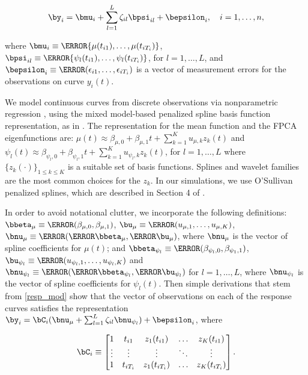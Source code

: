 \documentclass[ba]{imsart}
\numberwithin{equation}{section}
\theoremstyle{plain}
\def\betamu{\bbeta_\mu}
\def\umu{\bu_\mu}
\def\numu{\bnu_\mu}
\newcommand\betapsi[1]{\bbeta_{\psi_{#1}}}
\newcommand\upsi[1]{\bu_{\psi_{#1}}}
\newcommand\nupsi[1]{\bnu_{\psi_{#1}}}
\begin{document}
\begin{equation}
	\by_i = \bmu_i + \sum_{l=1}^L \zeta_{il} \bpsi_{il} + \bepsilon_{i}, \quad i = 1, \dots, n,
\label{resp_mod}
\end{equation}

\noindent where $\bmu_i \equiv \T{\{ \mu (t_{i1}), \dots, \mu (t_{iT_i}) \}}$,
$\bpsi_{il} \equiv \T{\{ \psi_l (t_{i1}), \dots, \psi_l (t_{iT_i}) \}}$, for $l = 1, \dots, L$, and
$\bepsilon_{i} \equiv \T{(\epsilon_{i1}, \dots, \epsilon_{iT_i})}$ is a vector of measurement errors
for the observations on curve $y_i (t)$.

We model continuous curves from discrete observations via nonparametric regression \citep{ruppert03, ruppert09},
using the mixed model-based penalized spline basis function representation, as in \citet{durban05}. The
representation for the mean function and the FPCA eigenfunctions are:
$\mu (t) \approx \beta_{\mu, 0} + \beta_{\mu, 1} t + \sum_{k=1}^K u_{\mu, k} z_k (t)$ and
$\psi_l (t) \approx \beta_{\psi_l, 0} + \beta_{\psi_l, 1} t + \sum_{k=1}^K u_{\psi_l, k} z_k (t)$,
for $l = 1, \dots, L$ where $\{ z_k (\cdot) \}_{1 \le k \le K}$ is a suitable set of
basis functions. Splines and wavelet families are the most common choices for the $z_k$. In our simulations, we
use O'Sullivan penalized splines, which are described in Section 4 of \citet{wand08}.

In order to avoid notational clutter, we incorporate the following definitions:
$\betamu \equiv \T{(\beta_{\mu, 0}, \beta_{\mu, 1})}$, $\umu \equiv \T{(u_{\mu, 1}, \dots, u_{\mu, K})}$,
$\numu \equiv \T{(\T{\betamu}, \T{\umu})}$, where $\numu$ is the vector of spline coefficients for $\mu (t)$;
and $\betapsi{l} \equiv \T{(\beta_{\psi_l, 0}, \beta_{\psi_1, 1})}$,
$\upsi{l} \equiv \T{(u_{\psi_l, 1}, \dots, u_{\psi_l, K})}$ and $\nupsi{l} \equiv \T{(\T{\betapsi{l}}, \T{\upsi{l}})}$
for $l = 1, \dots, L$, where $\nupsi{l}$ is the vector of spline coefficients for $\psi_l (t)$.
Then simple derivations that stem from \eqref{resp_mod} show that the vector of observations on
each of the response curves satisfies the representation $\by_i = \bC_i (\numu + \sum_{l=1}^L \zeta_{il} \nupsi{l}) +
\bepsilon_{i}$, where

\begin{equation}
	\bC_i \equiv \begin{bmatrix}
		1 & t_{i1} & z_1 (t_{i1}) & \dots & z_K (t_{i1}) \\
		\vdots & \vdots & \vdots & \ddots & \vdots \\
		1 & t_{iT_i} & z_1 (t_{iT_i}) & \dots & z_K (t_{iT_i})
	\end{bmatrix}.
\label{C_mat}
\end{equation}
\end{document}
